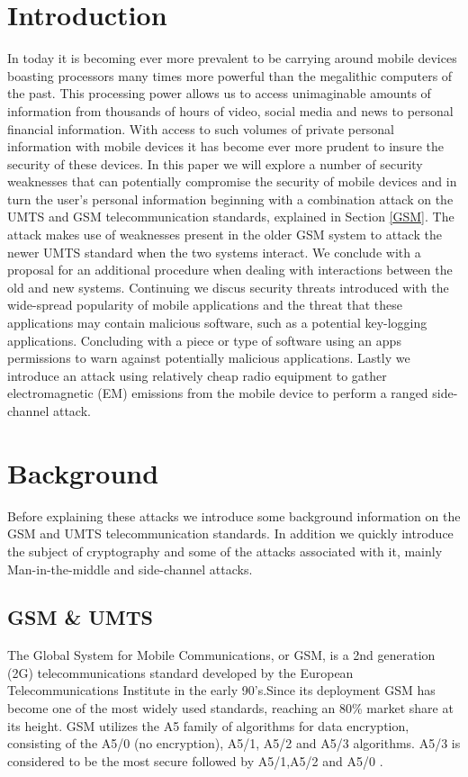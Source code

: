 \documentclass{sig-alternate}
\begin{document}
\section{Introduction}
In today it is becoming ever more prevalent to be carrying around mobile devices boasting processors many times more powerful than the megalithic computers of the past.  This processing power allows us to  access unimaginable amounts of information from thousands of hours of video, social media and news to personal financial information. With access to such volumes of private personal information with mobile devices it has become ever more prudent to insure the security of these devices. In this paper we will explore a number of security weaknesses that can potentially compromise the security of mobile devices and in turn the user's personal information beginning with a combination attack on the UMTS and GSM telecommunication standards, explained in Section \ref{GSM}. The attack makes use of weaknesses present in the older GSM system to attack the newer UMTS standard when the two systems interact. We conclude with a proposal for an additional procedure when dealing with interactions between the old and new systems. Continuing we discus security threats introduced with the wide-spread popularity of mobile applications and the threat that these applications may contain malicious software, such as a potential key-logging applications. Concluding with a piece or type of software using an apps permissions to warn against potentially malicious applications. Lastly we introduce an attack using relatively cheap radio equipment to gather electromagnetic (EM) emissions from the mobile device to perform a ranged side-channel attack.         

\section{Background}
	
Before explaining these attacks we introduce some background information on the GSM and UMTS telecommunication standards. In addition we quickly introduce the subject of cryptography and some of the attacks associated with it, mainly Man-in-the-middle and side-channel attacks.    	
	\subsection{GSM \& UMTS \label{GSM}}
	The Global System for Mobile Communications, or GSM, is a 2nd generation (2G) telecommunications standard developed by the European Telecommunications Institute in the early 90's.Since its deployment GSM has become one of the most widely used standards, reaching an 80\% market share at its height. GSM utilizes the A5 family of algorithms for data encryption, consisting of the A5/0 (no encryption), A5/1, A5/2 and A5/3 algorithms. A5/3 is considered to be the most secure followed by A5/1,A5/2 and A5/0 \cite{wiki:GSM}.  
\end{document}
